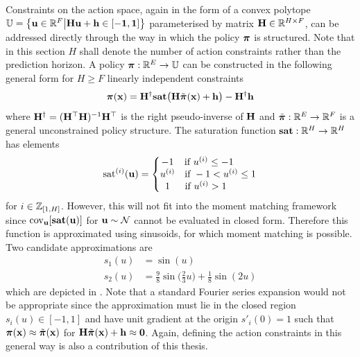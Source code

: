 Constraints on the action space, again in the form of a convex polytope $\mathbb{U} = \big\{\mathbf{u} \in \mathbb{R}^F \big| \mathbf{H}\mathbf{u} + \mathbf{h} \in [-\mathbf{1},\mathbf{1}] \big\}$ parameterised by matrix $\mathbf{H} \in \mathbb{R}^{H\times F}$, can be addressed directly through the way in which the policy $\boldsymbol{\pi}$ is structured. Note that in this section $H$ shall denote the number of action constraints rather than the prediction horizon. A policy $\boldsymbol{\pi}: \mathbb{R}^{E} \rightarrow \mathbb{U}$ can be constructed in the following general form for $H \geq F$ linearly independent constraints
\begin{equation}
\boldsymbol{\pi}(\mathbf{x}) = \mathbf{H}^{\dagger} \mathrm{\mathbf{sat}}\big( \mathbf{H}\tilde{\boldsymbol{\pi}}(\mathbf{x}) + \mathbf{h} \big) - \mathbf{H}^{\dagger}\mathbf{h}
\end{equation}
where $\mathbf{H}^{\dagger} = (\mathbf{H}^\top\mathbf{H})^{-1}\mathbf{H}^\top$ is the right pseudo-inverse of $\mathbf{H}$ and $\tilde{\boldsymbol{\pi}}: \mathbb{R}^{E} \rightarrow \mathbb{R}^F$ is a general unconstrained policy structure. The saturation function $\mathrm{\mathbf{sat}}: \mathbb{R}^{H} \rightarrow \mathbb{R}^{H}$ has elements
\begin{equation}
\mathrm{sat}^{(i)}(\bu) = \left\{ \begin{matrix}
-1 & \!\!\!\!\!\!\!\!\!\!\!\!\!\! \text{if } u^{(i)} \leq -1 \\
u^{(i)} & \text{if } -1 < u^{(i)} \leq 1 \\
1 & \!\!\!\!\!\!\!\!\!\!\!\!\!\!\!\!\!\! \text{if } u^{(i)} > 1
\end{matrix} \right.
\end{equation}
for $i \in \mathbb{Z}_{[1,H]}$. However, this will not fit into the moment matching framework since $\mathrm{cov}_{\mathbf{u}}[\mathrm{\mathbf{sat}}(\mathbf{u})]$ for $\mathbf{u} \sim \mathcal{N}$ cannot be evaluated in closed form. Therefore this function is approximated using sinusoids, for which moment matching is possible. Two candidate approximations are
\begin{align}
s_1(u) &= \sin(u) \label{eqn:gsin} \\
s_2(u) &= \tfrac{9}{8}\sin\big(\tfrac{2}{3}u\big) + \tfrac{1}{8}\sin(2u) \label{eqn:gsat}
\end{align}
which are depicted in . Note that a standard Fourier series expansion would not be appropriate since the approximation must lie in the closed region $s_i(u) \in [-1,1]$ and have unit gradient at the origin $s'_i(0) = 1$ such that $\boldsymbol{\pi}(\mathbf{x}) \approx \tilde{\boldsymbol{\pi}}(\mathbf{x})$ for $\mathbf{H}\tilde{\boldsymbol{\pi}}(\mathbf{x}) + \mathbf{h} \approx \mathbf{0}$. Again, defining the action constraints in this general way is also a contribution of this thesis.


